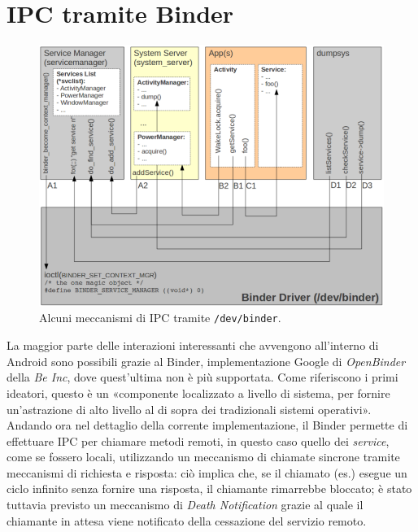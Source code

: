 \section{IPC tramite Binder}\label{sec:ipcbinder}
\begin{figure}[thp]
\centering
\includegraphics[scale=0.5]{img/embed/binder.png}
\caption{Alcuni meccanismi di IPC tramite \texttt{\small /dev/binder}. \parencite{libro:embedded}}
\label{fig:yagBinder}
\end{figure}

La maggior parte delle interazioni interessanti che avvengono all'interno di 
Android sono possibili grazie al Binder, implementazione Google di \textit{OpenBinder}
della \textit{Be Inc}, dove quest'ultima non è più supportata. Come riferiscono i primi
ideatori, questo è un «componente localizzato a livello
di sistema,  per fornire un'astrazione di alto livello al di sopra
dei tradizionali sistemi operativi». Andando ora nel dettaglio della corrente
implementazione, il Binder permette di effettuare IPC per chiamare metodi
remoti, in questo caso quello dei \textit{service}, come se fossero locali, utilizzando
un meccanismo di chiamate sincrone tramite meccanismi di richiesta e risposta:
ciò implica che, se il chiamato (es.) esegue un ciclo infinito senza fornire una
risposta, il chiamante rimarrebbe bloccato;
è stato tuttavia previsto un meccanismo di \textit{Death Notification}
grazie al quale il chiamante in attesa viene notificato della cessazione del
servizio remoto.

